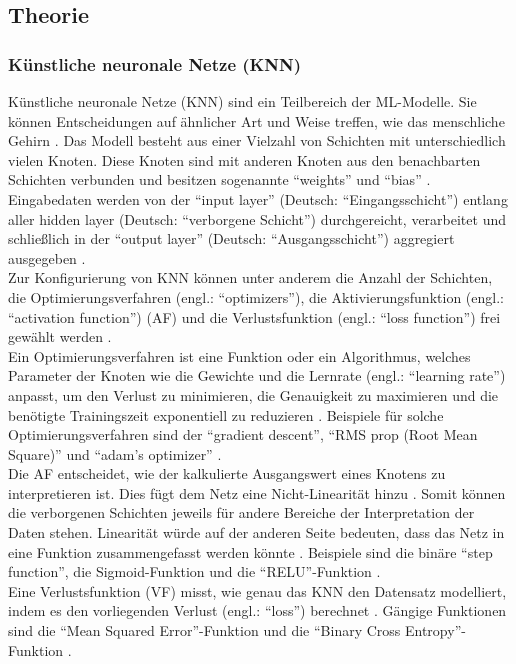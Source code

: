 \documentclass{scrartcl}
\begin{document}
\subsection{Theorie}

\subsubsection{Künstliche neuronale Netze (KNN)}
Künstliche neuronale Netze (KNN) sind ein Teilbereich der ML-Modelle. Sie können
Entscheidungen auf ähnlicher Art und Weise treffen, wie das menschliche Gehirn \cite{ibm}.
Das Modell besteht aus einer Vielzahl von Schichten mit unterschiedlich vielen
Knoten. Diese Knoten sind mit anderen Knoten aus den benachbarten Schichten verbunden
und besitzen sogenannte \enquote{weights} und \enquote{bias} \cite{ibm}.
Eingabedaten werden von der \enquote{input layer} (Deutsch: \enquote{Eingangsschicht})
entlang aller hidden layer (Deutsch: \enquote{verborgene Schicht}) durchgereicht,
verarbeitet und schließlich in der \enquote{output layer}
(Deutsch: \enquote{Ausgangsschicht}) aggregiert ausgegeben \cite{ibm}.
\medskip \\
Zur Konfigurierung von KNN können unter anderem die Anzahl der Schichten,
die Optimierungsverfahren (engl.: \enquote{optimizers}), die
Aktivierungsfunktion (engl.: \enquote{activation function}) (AF) und die
Verlustsfunktion (engl.: \enquote{loss function}) frei gewählt werden
\cite{actopt}.
\medskip \\
Ein Optimierungsverfahren ist eine Funktion oder ein Algorithmus, welches
Parameter der Knoten wie die Gewichte und die Lernrate (engl.: \enquote{learning rate})
anpasst, um den Verlust zu minimieren, die Genauigkeit zu maximieren und
die benötigte Trainingszeit exponentiell zu reduzieren \cite{actopt}.
Beispiele für solche Optimierungsverfahren sind der \enquote{gradient descent},
\enquote{RMS prop (Root Mean Square)} und \enquote{adam's optimizer} \cite{actopt}.
\smallskip \\
Die AF entscheidet, wie der kalkulierte Ausgangswert
eines Knotens zu interpretieren ist. Dies fügt dem Netz eine Nicht-Linearität
hinzu \cite{actopt}. Somit können die verborgenen Schichten jeweils für
andere Bereiche der Interpretation der Daten stehen. Linearität würde auf
der anderen Seite bedeuten, dass das Netz in eine Funktion zusammengefasst
werden könnte \cite{actopt}. Beispiele sind die binäre \enquote{step function},
die Sigmoid-Funktion und die \enquote{RELU}-Funktion \cite{actopt}.
\smallskip \\
Eine Verlustsfunktion (VF) misst, wie genau das KNN den Datensatz modelliert, indem
es den vorliegenden Verlust (engl.: \enquote{loss}) berechnet \cite{actopt}.
Gängige Funktionen sind die \enquote{Mean Squared Error}-Funktion und die
\enquote{Binary Cross Entropy}-Funktion \cite{actopt}.
\end{document}
